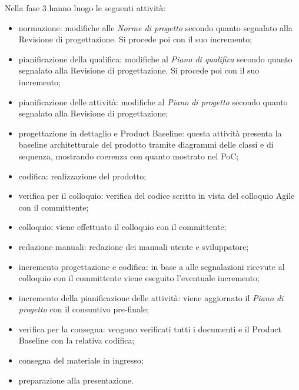 Nella fase 3 hanno luogo le seguenti attività:
\begin{itemize}
	\item normazione: modifiche alle \textit{Norme di progetto} secondo quanto segnalato alla Revisione di progettazione. Si procede poi con il suo incremento;
	\item pianificazione della qualifica: modifiche al \textit{Piano di qualifica} secondo quanto segnalato alla Revisione di progettazione. Si procede poi con il suo incremento;
	\item pianificazione delle attività: modifiche al \textit{Piano di progetto} secondo quanto segnalato alla Revisione di progettazione;
	\item progettazione in dettaglio e Product Baseline: questa attività presenta la baseline architetturale del prodotto tramite diagrammi delle classi e di sequenza, mostrando coerenza con quanto mostrato nel PoC;
	\item codifica: realizzazione del prodotto;
	\item verifica per il colloquio: verifica del codice scritto in vista del colloquio Agile con il committente;
	\item colloquio: viene effettuato il colloquio con il committente;
	\item redazione manuali: redazione dei manuali utente e sviluppatore;
	\item incremento progettazione e codifica: in base a alle segnalazioni ricevute al colloquio con il committente viene eseguito l'eventuale incremento;
	\item incremento della pianificazione delle attività: viene aggiornato il \textit{Piano di progetto} con il consuntivo pre-finale;
	\item verifica per la consegna: vengono verificati tutti i documenti e il Product Baseline con la relativa codifica;
	\item consegna del materiale in ingresso;
	\item preparazione alla presentazione.
\end{itemize}